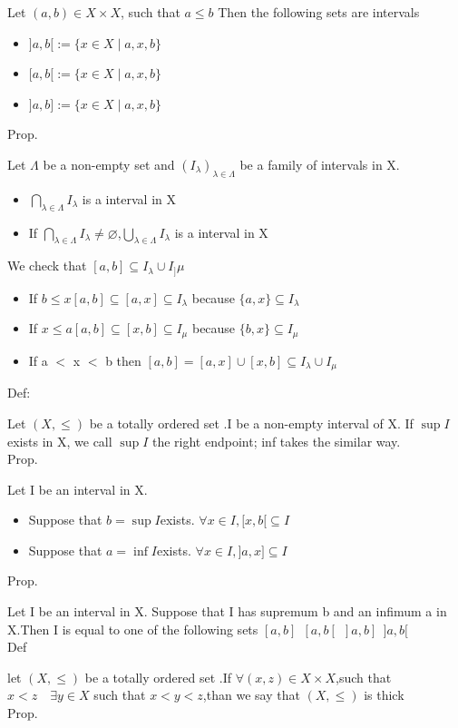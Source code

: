 \documentclass{book}
\begin{document}
Let $(a,b)\in X\times X$, such that $a\leq b$ Then the following sets are intervals
\begin{itemize}
    \item $]a,b[:=\{x\in X\mid a,x,b\}$
    \item $[a,b[:=\{x\in X\mid a,x,b\}$
    \item $]a,b]:=\{x\in X\mid a,x,b\}$
\end{itemize}
Prop. 

Let $\Lambda$ be a non-empty set and $(I_\lambda)_{\lambda\in \Lambda}$ be a family of intervals in X.
\begin{itemize}
    \item $\bigcap\limits_{\lambda\in\Lambda}I_\lambda$ is a interval in X
    \item If $\bigcap\limits_{\lambda\in\Lambda}I_\lambda\not=\varnothing $,$\bigcup\limits_{\lambda\in\Lambda}I_\lambda$ is a interval in X
\end{itemize}
We check that $[a,b]\subseteq I_\lambda\cup I_]\mu$
\begin{itemize}
    \item If $b\leq x$\quad $[a,b]\subseteq[a,x]\subseteq I_\lambda$ because $\{a,x\}\subseteq I_\lambda$
    \item If $x\leq a$\quad $[a,b]\subseteq[x,b]\subseteq I_\mu $ because $\{b,x\}\subseteq I_\mu$
    \item If a $<$ x $<$ b then $[a,b]=[a,x]\cup[x,b]\subseteq I_\lambda\cup I_\mu$
\end{itemize}
Def:

Let $(X,\leq)$ be a totally ordered set .I be a non-empty interval of X. If $\sup I$ exists in X, we call $\sup I$ the right endpoint; inf takes the similar way.\\
Prop.

Let I be an interval in X.
\begin{itemize}
    \item Suppose that $b=\sup I$exists. $\forall x\in I,[x,b[\subseteq I$
    \item Suppose that $a=\inf I$exists. $\forall x\in I,]a,x]\subseteq I$
\end{itemize}
Prop.

Let I be an interval in X. Suppose that I has supremum b and an infimum a in X.Then I is equal to one of the following sets $[a,b]\ \ [a,b[\ \ ]a,b]\ \ ]a,b[$\\
Def 

let $(X,\leq)$ be a totally ordered set .If $\forall (x,z)\in X\times X$,such that $x<z\quad \exists y\in X$ such that $x<y<z$,than we say that $(X,\leq)$ is thick\\
Prop. 
\end{document}
